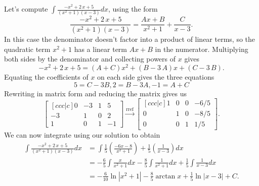 \begin{example}
Let's compute $\int {\frac {-{x}^{2}+2\,x+5}{ \left( {x}^{2}+1 \right)  \left( x-3
 \right) }}dx$, using the form  
$${\frac {-{x}^{2}+2\,x+5}{ \left( {x}^{2}+1 \right)  \left( x-3
 \right) }}={\frac {Ax+B}{{x}^{2}+1}}+{\frac {C}{x-3}}.$$
In this case the denominator doesn't factor into a product of linear terms, so the quadratic term $x^2+1$ has a linear term $Ax+B$ in the numerator.  Multiplying both sides by the denominator and collecting powers of $x$ gives
$$-{x}^{2}+2\,x+5= \left( A+C \right) {x}^{2}+ \left( B-3\,A \right) x+(C-3\,B).$$
Equating the coefficients of $x$ on each side gives the three equations 
$$5=C-3B, 2=B-3A, -1=A+C$$
Rewriting in matrix form and reducing the matrix gives us
$$
\begin{bmatrix}[ccc|c] 
0&-3&1&5\\
-3&1&0&2\\
1&0&1&-1
\end {bmatrix}
\xrightarrow{\text{rref}}
\begin{bmatrix}[ccc|c]
1&0&0&-6/5\\
0&1&0&-8/5\\
0&0&1&1/5
\end {bmatrix} .
$$
We can now integrate using our solution to obtain 
\begin{align*}
\int {\frac {-{x}^{2}+2\,x+5}{ \left( {x}^{2}+1 \right)  \left( x-3\right) }}dx
&= \int {\frac{1}{5}\left(\frac {-6x-8}{{x}^{2}+1}\right)}+ \frac{1}{5}\left({\frac {1}{x-3}}\right)dx \\
&= -\frac{6}{5}\int \frac{x}{x^2+1}dx -\frac{8}{5}\int \frac{1}{x^2+1}dx +\frac{1}{5}\int{\frac {1}{x-3}}dx\\
&= -\frac{6}{10}\ln|{x^2+1}| -\frac{8}{5}\arctan x +\frac{1}{5}\ln|{x-3}|+C.
\end{align*}
\end{example}












